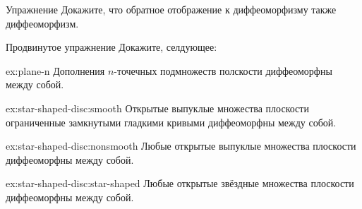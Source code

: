 \begin{thm}{Упражнение}\label{ex:inv-diffeomorphism}
Докажите, что обратное отображение к диффеоморфизму также диффеоморфизм.
\end{thm}

\begin{thm}{Продвинутое упражнение}\label{ex:star-shaped-disc}
Докажите, селдующее:

\begin{subthm}{ex:plane-n}
Дополнения $n$-точечных подмножеств полскости диффеоморфны между собой.
\end{subthm}

\begin{subthm}{ex:star-shaped-disc:smooth}
Открытые выпуклые множества плоскости ограниченные замкнутыми гладкими кривыми диффеоморфны между собой.
\end{subthm}

{\sloppy

\begin{subthm}{ex:star-shaped-disc:nonsmooth}
Любые открытые выпуклые множества плоскости диффеоморфны между собой.
\end{subthm}

\begin{subthm}{ex:star-shaped-disc:star-shaped}
Любые открытые звёздные множества плоскости диффеоморфны между собой.
\end{subthm}

}

\end{thm}
